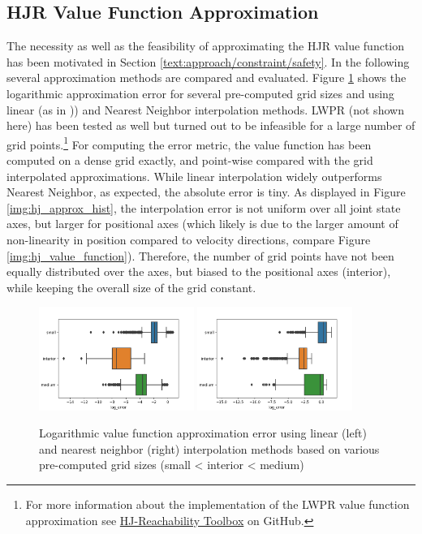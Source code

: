 \subsection{HJR Value Function Approximation}
The necessity as well as the feasibility of approximating the \ac{HJR} value function has been motivated in Section \ref{text:approach/constraint/safety}. In the following several approximation methods are compared and evaluated.
\newline 
Figure \ref{img:hj_approx_bar} shows the logarithmic approximation error for several pre-computed grid sizes and using linear (as in \cite{Leung2020})) and Nearest Neighbor interpolation methods. LWPR (not shown here) has been tested as well but turned out to be infeasible for a large number of grid points.\footnote{For more information about the implementation of the LWPR value function approximation see \href{https://github.com/simon-schaefer/HJReachibility}{HJ-Reachability Toolbox} on GitHub.} For computing the error metric, the value function has been computed on a dense grid exactly, and point-wise compared with the grid interpolated approximations. While linear interpolation widely outperforms Nearest Neighbor, as expected, the absolute error is tiny. As displayed in Figure \ref{img:hj_approx_hist}, the interpolation error is not uniform over all joint state axes, but larger for positional axes (which likely is due to the larger amount of non-linearity in position compared to velocity directions, compare Figure \ref{img:hj_value_function}). Therefore, the number of grid points have not been equally distributed over the axes, but biased to the positional axes (interior), while keeping the overall size of the grid constant.

\begin{figure}[!ht]
\begin{center}
\includegraphics[width=0.45\textwidth]{images/hj_bar_linear.png}
\includegraphics[width=0.45\textwidth]{images/hj_bar_nearest.png}
\caption{Logarithmic value function approximation error using linear (left) and nearest neighbor (right) interpolation methods based on various pre-computed grid sizes (small < interior < medium)}
\label{img:hj_approx_bar}
\end{center}
\end{figure}

